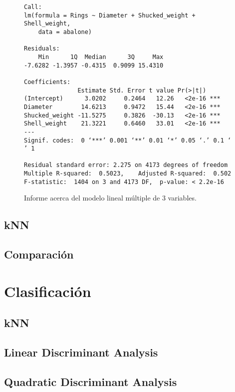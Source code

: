 \documentclass[a4paper, 11pt]{article}
\begin{document}
\begin{figure}[ht]
  \begin{Verbatim}[fontsize=\scriptsize]
Call:
lm(formula = Rings ~ Diameter + Shucked_weight + Shell_weight, 
    data = abalone)

Residuals:
    Min      1Q  Median      3Q     Max 
-7.6282 -1.3957 -0.4315  0.9099 15.4310 

Coefficients:
               Estimate Std. Error t value Pr(>|t|)    
(Intercept)      3.0202     0.2464   12.26   <2e-16 ***
Diameter        14.6213     0.9472   15.44   <2e-16 ***
Shucked_weight -11.5275     0.3826  -30.13   <2e-16 ***
Shell_weight    21.3221     0.6460   33.01   <2e-16 ***
---
Signif. codes:  0 ‘***’ 0.001 ‘**’ 0.01 ‘*’ 0.05 ‘.’ 0.1 ‘ ’ 1

Residual standard error: 2.275 on 4173 degrees of freedom
Multiple R-squared:  0.5023,	Adjusted R-squared:  0.502 
F-statistic:  1404 on 3 and 4173 DF,  p-value: < 2.2e-16
  \end{Verbatim}
  \caption{\label{fig:3lm}Informe acerca del modelo lineal múltiple de 3 variables.}
  
\end{figure}


\subsection{kNN}
\subsection{Comparación}

\section{Clasificación}

\subsection{kNN}
\subsection{Linear Discriminant Analysis}
\subsection{Quadratic Discriminant Analysis}

\clearpage

\appendix
\end{document}
